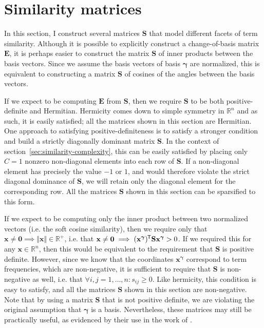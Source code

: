 \documentclass[
  digital, %
  notable, %
  lof,     %
  lot,     %
  nopalatino, color
]{fithesis3}
\newcommand*{\tran}{^{\mkern-1.5mu\mathsf{T}}}
\begin{document}
\section{Similarity matrices}
\label{sec:similarity-measures}
In this section, I construct several matrices $\mathbf S$ that model different facets of term similarity. Although it is possible to
explicitly construct a change-of-basis matrix $\mathbf E$,
it is perhaps easier to construct the matrix $\mathbf S$ of inner products
between the basis vectors. Since we assume the basis vectors of basis
$\bm\gamma$ are normalized, this is equivalent to
constructing a matrix $\mathbf S$ of cosines of the angles
between the basis vectors.

If we expect to be computing $\mathbf E$
from $\mathbf S$,
then we require $\mathbf S$ to be both positive-definite and Hermitian.
Hermicity comes down to simple symmetry in $\mathbb{R}^n$ and as such, it is
easily satisfied; all the matrices shown in this section are Hermitian.
One approach to satisfying positive-definiteness is to satisfy a stronger
condition and build a strictly diagonally dominant matrix $\mathbf S$. In the
context of section~\ref{sec:similarity-complexity}, this can be easily
satisfied by placing only $C=1$ nonzero non-diagonal elements into
each row of $\mathbf S$. If a non-diagonal element has precisely the value $-1$
or $1$, and would therefore violate the strict diagonal dominance of $\mathbf
S$, we will retain only the diagonal element for the corresponding row. All the
matrices $\mathbf S$ shown in this section can be sparsified to this form.

If we expect to be computing only the inner product between two normalized
vectors (i.e. the soft cosine similarity), then
we require only that $\mathbf x\not=\mathbf0\implies\Vert\mathbf
x\Vert\in\mathbb{R}^+$, i.e. that $\mathbf
x\not=\mathbf0\implies(\mathbf{x}^{\bm\gamma})\tran\mathbf S\mathbf x^{\bm\gamma}>0$.
If we required this for any $\mathbf x\in\mathbb R^n$, then this would be
equivalent to the requirement that $\mathbf S$ is positive
definite. However, since we know that the
coordinates $\mathbf x^{\bm\gamma}$ correspond to term frequencies, which are
non-negative, it is sufficient to require that $\mathbf S$ is non-negative as
well, i.e. that $\forall i, j=1,\ldots,n: s_{ij}\geq0$.  Like
hermicity, this condition is easy to satisfy, and all
the matrices $\mathbf S$ shown in this section are non-negative.  Note that by
using a matrix $\mathbf S$ that is not positive definite, we are violating the original assumption that
$\bm\gamma$ is a basis. Nevertheless, these matrices may
still be practically useful, as evidenced by their use in the work of
\textcite{charletdamnati17}.
\end{document}
